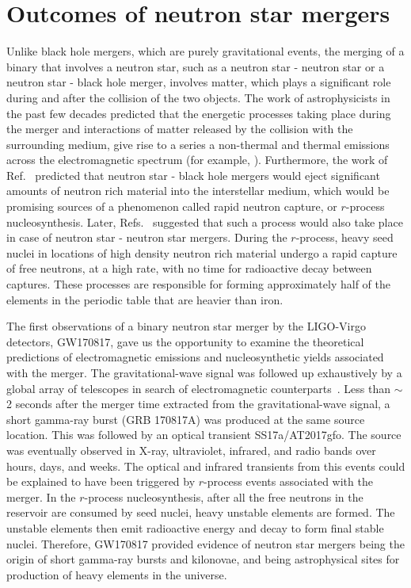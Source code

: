 \section{Outcomes of neutron star mergers}
Unlike black hole mergers, which are purely gravitational events, the merging of a binary that involves a neutron star, such as a neutron star - neutron star or a neutron star - black hole merger, involves matter, which plays a significant role during and after the collision of the two objects. The work of astrophysicists in the past few decades predicted that the energetic processes taking place during the merger and interactions of matter released by the collision with the surrounding medium, give rise to a series a non-thermal and thermal emissions across the electromagnetic spectrum (for example, \cite{Bloom:2008ua,Metzger:2011bv,Piran:2012wd,Rosswog:2015nja,Fernandez:2015use,1986ApJ...308L..43P,Eichler:1989ve,Narayan:1992iy,Nakar:2011,Hotokezaka:2015eja,Li:1998bw,2010MNRAS.406.2650M,2011ApJ...736L..21R}). Furthermore, the work of Ref.~\cite{1974ApJ...192L.145L} predicted that neutron star - black hole mergers would eject significant amounts of neutron rich material into the interstellar medium, which would be promising sources of a phenomenon called rapid neutron capture, or $r$-process nucleosynthesis. Later, Refs.~\cite{1982ApL....22..143S, Eichler:1989ve} suggested that such a process would also take place in case of neutron star - neutron star mergers.  During the $r$-process, heavy seed nuclei in locations of high density neutron rich material undergo a rapid capture of free neutrons, at a high rate, with no time for radioactive decay between captures. These processes are responsible for forming approximately half of the elements in the periodic table that are heavier than iron.

The first observations of a binary neutron star merger by the LIGO-Virgo detectors, GW170817, gave us the opportunity to examine the theoretical predictions of electromagnetic emissions and nucleosynthetic yields associated with the merger. The gravitational-wave signal was followed up exhaustively by a global array of telescopes in search of electromagnetic counterparts~\cite{GBM:2017lvd}. Less than $\sim$ 2 seconds after the merger time extracted from the gravitational-wave signal, a short gamma-ray burst (GRB 170817A) was produced at the same source location. This was followed by an optical transient SS17a/AT2017gfo. The source was eventually observed in X-ray, ultraviolet, infrared, and radio bands over hours, days, and weeks. The optical and infrared transients from this events could be explained to have been triggered by $r$-process events associated with the merger. In the $r$-process nucleosynthesis, after all the free neutrons in the reservoir are consumed by seed nuclei, heavy unstable elements are formed. The unstable elements then emit radioactive energy and decay to form final stable nuclei. Therefore, GW170817 provided evidence of neutron star mergers being the origin of short gamma-ray bursts and kilonovae, and being astrophysical sites for production of heavy elements in the universe.  

